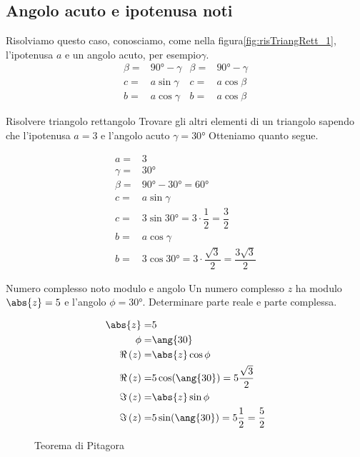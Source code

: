 \subsection{Angolo acuto e ipotenusa noti}
Risolviamo questo caso, conosciamo, come nella figura\nobs\vref{fig:risTriangRett_1}, l'ipotenusa $a$ e un angolo acuto, per esempio\nobs$\gamma$.
\begin{align*}
\beta=&\ang{90}-\gamma&\beta=&\ang{90}-\gamma\\
c=&a\sin\gamma&c=&a\cos\beta\\
b=&a\cos\gamma&b=&a\cos\beta
\end{align*}
\begin{esempiot}{Risolvere triangolo rettangolo}{}
Trovare gli altri elementi di un triangolo sapendo che l'ipotenusa $a=3$ e l'angolo acuto $\gamma=\ang{30}$  Otteniamo quanto segue.
\end{esempiot}
\begin{align*}
a=&3\\
\gamma=&\ang{30}\\
\beta=&\ang{90}-\ang{30}=\ang{60}\\
c=&a\sin\gamma\\
c=&3\sin\ang{30}=3\cdot\dfrac{1}{2}=\dfrac{3}{2}\\
b=&a\cos\gamma\\
b=&3\cos\ang{30}=3\cdot\dfrac{\sqrt{3}}{2}=\dfrac{3\sqrt{3}}{2}
\end{align*}
\begin{esempiot}{Numero complesso noto modulo e angolo }{}
	Un numero complesso $z$ ha modulo $\abs{z}=5$ e l'angolo $\phi=\ang{30}$.  Determinare parte reale e parte complessa.
\end{esempiot}
\begin{align*}
\abs{z}=&5\\
\phi=&\ang{30}\\
\Re\left(z\right)=&\abs{z}\cos\phi\\
\Re\left(z\right)=&5\cos(\ang{30})=5\frac{\sqrt{3}}{2}\\
\Im\left(z\right)=&\abs{z}\sin\phi\\
\Im\left(z\right)=&5\sin(\ang{30})=5\dfrac{1}{2}=\dfrac{5}{2}\\
\end{align*}
\begin{figure}
	\centering
	
	\caption{Teorema di Pitagora}
	\label{fig:TeoremaPitagora_1}
\end{figure}
